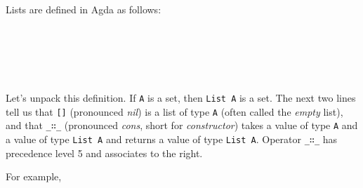 Lists are defined in Agda as follows:

\begin{fence}
\begin{code}%
\>[0]\AgdaSpace{}%
\AgdaSpace{}%
\AgdaSymbol{(}\AgdaSpace{}%
\AgdaSymbol{:}\AgdaSpace{}%
\AgdaSymbol{)}\AgdaSpace{}%
\AgdaSymbol{:}\AgdaSpace{}%
\AgdaSpace{}%
\<%
\\
\>[0][@{}l@{\AgdaIndent{0}}]%
\>[2]\AgdaInductiveConstructor{[]}%
\>[6]\AgdaSymbol{:}\AgdaSpace{}%
\AgdaSpace{}%
\<%
\\
%
\>[2]\AgdaSpace{}%
\AgdaSymbol{:}\AgdaSpace{}%
\AgdaSpace{}%
\AgdaSpace{}%
\AgdaSpace{}%
\AgdaSpace{}%
\AgdaSpace{}%
\AgdaSpace{}%
\<%
\\
%
\\[\AgdaEmptyExtraSkip]%
\>[0]\AgdaSpace{}%
\AgdaSpace{}%
\<%
\end{code}
\end{fence}

Let's unpack this definition. If \texttt{A} is a set, then
\texttt{List\ A} is a set. The next two lines tell us that
\texttt{{[}{]}} (pronounced \emph{nil}) is a list of type \texttt{A}
(often called the \emph{empty} list), and that \texttt{\_∷\_}
(pronounced \emph{cons}, short for \emph{constructor}) takes a value of
type \texttt{A} and a value of type \texttt{List\ A} and returns a value
of type \texttt{List\ A}. Operator \texttt{\_∷\_} has precedence level 5
and associates to the right.

For example,

\begin{fence}
\begin{code}%
\>[0]\AgdaFunction{\AgdaUnderscore{}}\AgdaSpace{}%
\AgdaSymbol{:}\AgdaSpace{}%
\AgdaSpace{}%
\<%
\\
\>[0]\AgdaSymbol{\AgdaUnderscore{}}\AgdaSpace{}%
\AgdaSymbol{=}\AgdaSpace{}%
\AgdaSpace{}%
\AgdaSpace{}%
\AgdaSpace{}%
\AgdaSpace{}%
\AgdaSpace{}%
\AgdaSpace{}%
\AgdaInductiveConstructor{[]}\<%
\end{code}
\end{fence}

